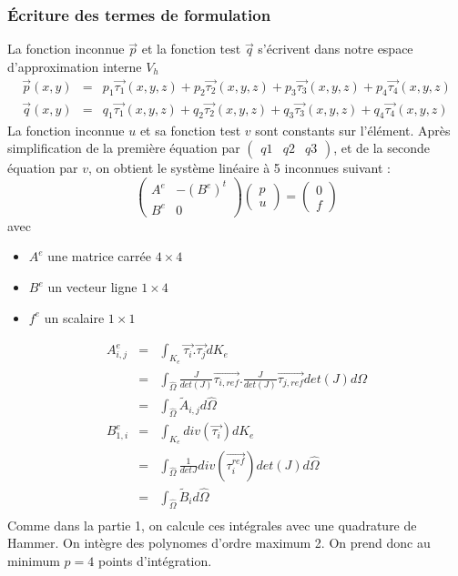 \documentclass[a4paper,12pt]{article}
\begin{document}
\subsubsection{Écriture des termes de formulation}
La fonction inconnue $\vec{p}$ et la fonction test $\vec{q}$ s'écrivent dans notre espace d'approximation interne $V_{h}$
\begin{eqnarray*}
\vec{p}(x,y) &=& p_{1} \vec{\tau_{1}}(x,y,z) + p_{2} \vec{\tau_{2}}(x,y,z) + p_{3} \vec{\tau_{3}}(x,y,z) + p_{4} \vec{\tau_{4}}(x,y,z) \\
\vec{q}(x,y) &=& q_{1} \vec{\tau_{1}}(x,y,z) + q_{2} \vec{\tau_{2}}(x,y,z) + q_{3} \vec{\tau_{3}}(x,y,z) + q_{4} \vec{\tau_{4}}(x,y,z)
\end{eqnarray*}
La fonction inconnue $u$ et sa fonction test $v$ sont constants sur l'élément. Après simplification de la première équation par $\begin{pmatrix} q1 & q2 & q3 \end{pmatrix}$,
et de la seconde équation par $v$, on obtient le système linéaire à 5 inconnues suivant : 
\[
\begin{pmatrix}
A^{e} & -(B^{e})^{t}\\
B^{e} & 0
\end{pmatrix}
\begin{pmatrix}
p\\
u
\end{pmatrix}
=
\begin{pmatrix}
0\\
f
\end{pmatrix}
\]
avec 
\begin{itemize}
 \item $A^{e}$ une matrice carrée $4 \times 4$
 \item $B^{e}$ un vecteur ligne $1 \times 4$
 \item $f^{e}$ un scalaire $1 \times 1$
\end{itemize}
\begin{eqnarray*}
A_{i,j}^{e} &=& \int_{K_{e}} {\vec{\tau_{i}}.\vec{\tau_{j}} dK_{e} } \\
&=&
\int_{\hat{\Omega}} {\frac{J}{det(J)}\vec{\tau_{i,ref}}.\frac{J}{det(J)}\vec{\tau_{j,ref}} det(J) \hat{d\Omega}} \\
&=&
\int_{\hat{\Omega}} {\tilde{A}_{i,j} d\hat{\Omega}} \\
B_{1,i}^{e} &=&
\int_{K_{e}} {div(\vec{\tau_{i}}) dK_{e}} \\
&=&
\int_{\hat{\Omega}} {\frac{1}{detJ}div(\vec{\tau_{i}^{ref}}) det(J) d\hat{\Omega}} \\
&=&
\int_{\hat{\Omega}} {\tilde{B}_{i} d\hat{\Omega}} \\
\end{eqnarray*}
Comme dans la partie 1, on calcule ces intégrales avec une quadrature de Hammer. On intègre des polynomes d'ordre maximum 2. 
On prend donc au minimum $p=4$ points d'intégration.
\end{document}
